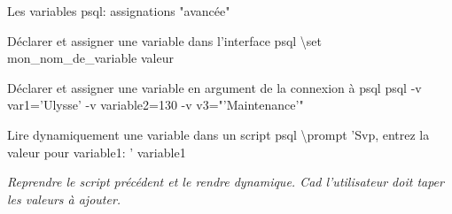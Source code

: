 \documentclass[dvipsnames]{beamer}
\begin{document}
\begin{frame}{Les variables psql: assignations "avancée"}
	\begin{block}{Déclarer et assigner une variable dans l'interface psql}
		\textbackslash set mon\_nom\_de\_variable valeur
	\end{block}

	\begin{block}{Déclarer et assigner une variable en argument de la connexion à psql}
		psql -v var1='Ulysse' -v variable2=130 -v v3="'Maintenance'"
	\end{block}
	
	\begin{block}{Lire dynamiquement une variable dans un script psql}
		\textbackslash prompt 'Svp, entrez la valeur pour variable1: ' variable1
	\end{block}

	\textit{Reprendre le script précédent et le rendre dynamique. Cad l'utilisateur doit taper les valeurs à ajouter.}	
	
\end{frame}




%
%
\end{document}
